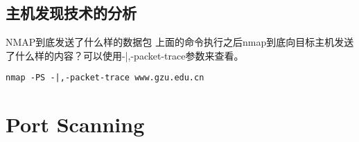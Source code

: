 \documentclass{beamer}
\begin{document}
\subsection{主机发现技术的分析}
\begin{frame}
\end{frame}
\begin{frame}[fragile]{NMAP到底发送了什么样的数据包}
上面的命令执行之后nmap到底向目标主机发送了什么样的内容？可以使用-|,-packet-trace参数来查看。
\begin{example}[命令语法]
\begin{verbatim}
nmap -PS -|,-packet-trace www.gzu.edu.cn
\end{verbatim}
\end{example}

\end{frame}
\section{Port Scanning}
\begin{frame}
\end{frame}
\end{document}
